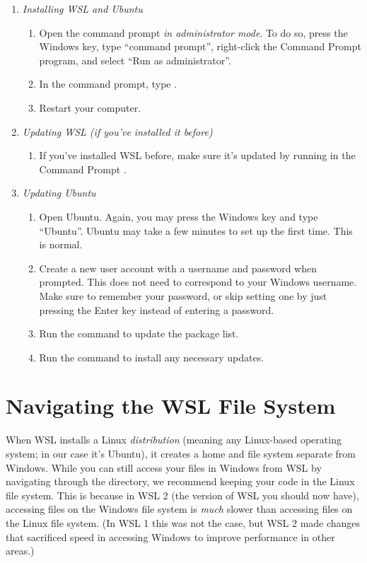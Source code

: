 \begin{enumerate}
    \item \emph{Installing WSL and Ubuntu}
    \begin{enumerate}
        \item Open the command prompt \emph{in administrator mode}.
        To do so, press the Windows key, type ``command prompt'', right-click the Command Prompt program, and select ``Run as administrator''.
        \item In the command prompt, type .
        \item Restart your computer.
    \end{enumerate}
    \item \emph{Updating WSL (if you've installed it before)}
    \begin{enumerate}
        \item If you've installed WSL before, make sure it's updated by running in the Command Prompt .
    \end{enumerate}
    \item \emph{Updating Ubuntu}
    \begin{enumerate}
        \item Open Ubuntu.
        Again, you may press the Windows key and type ``Ubuntu''.
        Ubuntu may take a few minutes to set up the first time. This is normal.
        \item Create a new user account with a username and password when prompted.
        This does not need to correspond to your Windows username.
        Make sure to remember your password, or skip setting one by just pressing the Enter key instead of entering a password.
        \item Run the command  to update the package list.
        \item Run the command  to install any necessary updates.
    \end{enumerate}
\end{enumerate}

\section*{Navigating the WSL File System}

When WSL installs a Linux \emph{distribution} (meaning any Linux-based operating system; in our case it's Ubuntu), it creates a home and file system separate from Windows.
While you can still access your files in Windows from WSL by navigating through the  directory, we recommend keeping your code in the Linux file system.
This is because in WSL 2 (the version of WSL you should now have), accessing files on the Windows file system is \emph{much} slower than accessing files on the Linux file system.
(In WSL 1 this was not the case, but WSL 2 made changes that sacrificed speed in accessing Windows to improve performance in other areas.)

